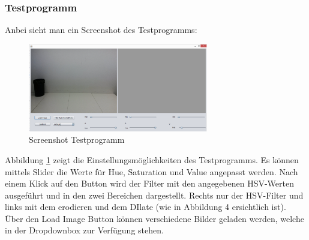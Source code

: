 \subsubsection{Testprogramm}
Anbei sieht man ein Screenshot des Testprogramms:
\begin{figure}[h!]
    \centering
    \includegraphics[width=0.7\textwidth]{fig/Testprogramm.png}
    \caption{Screenshot Testprogramm}
    \label{fig:Korb_Testprogramm}
\end{figure}

Abbildung \ref{fig:Korb_Testprogramm} zeigt die Einstellungsmöglichkeiten des 
Testprogramms. Es können mittels Slider die Werte für Hue, Saturation und 
Value angepasst werden. Nach einem Klick auf den Button wird der Filter mit 
den angegebenen HSV-Werten ausgeführt und in den zwei Bereichen dargestellt. 
Rechts nur der HSV-Filter und links mit dem erodieren und dem DIlate (wie in 
Abbildung 4 ersichtlich ist). \\
Über den Load Image Button können verschiedene Bilder geladen werden, welche 
in der Dropdownbox zur Verfügung stehen.
